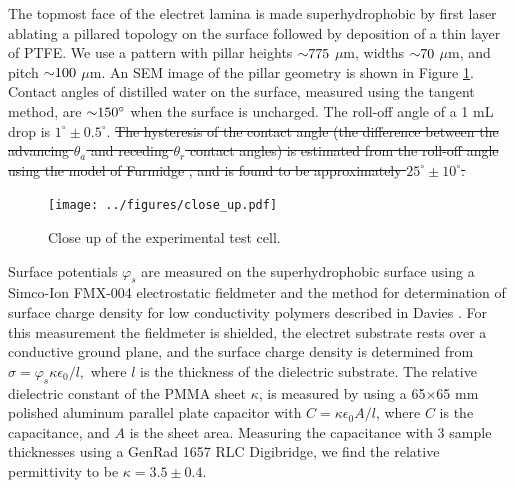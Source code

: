 \documentclass[aip,reprint, floatfix]{revtex4-1}
\begin{document}
The topmost face of the electret lamina is made superhydrophobic by first laser ablating a pillared topology  on the surface followed by deposition of a thin layer of PTFE. We use a pattern with pillar heights $\sim \hspace{-1mm} 775$ $\mu$m, widths $\sim \hspace{-1mm} 70$ $\mu$m, and pitch $\sim \hspace{-1mm} 100$ $\mu$m. An SEM image of the pillar geometry is shown in Figure \ref{fig:SEM}. Contact angles of distilled water on the surface, measured using the tangent method, are $\sim \hspace{-1mm} 150^{\circ}$ when the surface is uncharged. The roll-off angle of a 1 mL drop is $1^{\circ} \pm 0.5^{\circ}$. \sout{The hysteresis of the contact angle (the difference between the advancing $\theta_a$ and receding $\theta_r$ contact angles) is estimated from the roll-off angle using the model of Furmidge \cite{furmidge_studies_1962}, and is found to be approximately $25^{\circ} \pm 10^{\circ}$.}

\begin{figure}
    \centering
    \def\svgwidth{\columnwidth}
        \texttt{[image: ../figures/close\_up.pdf]}
    \caption{Close up of the experimental test cell.\label{fig:SEM}}
\end{figure}

Surface potentials $\varphi_s$ are measured on the superhydrophobic surface using a Simco-Ion FMX-004 electrostatic fieldmeter and the method for determination of surface charge density for low conductivity polymers described in Davies \cite{davies_examination_1967}. For this measurement the fieldmeter is shielded, the electret substrate rests over a conductive ground plane, and the surface charge density is determined from $\sigma = \varphi_s \kappa \epsilon_0/l,$ where $l$ is the thickness of the dielectric substrate. The relative dielectric constant of the PMMA sheet $\kappa$, is measured by using a 65$\times$65 mm polished aluminum parallel plate capacitor with $C = \kappa \epsilon_0 A/l$, where $C$ is the capacitance, and $A$ is the sheet area. Measuring the capacitance with 3 sample thicknesses using a GenRad 1657 RLC Digibridge, we find the relative permittivity to be $\kappa = 3.5 \pm 0.4$.  
\end{document}
